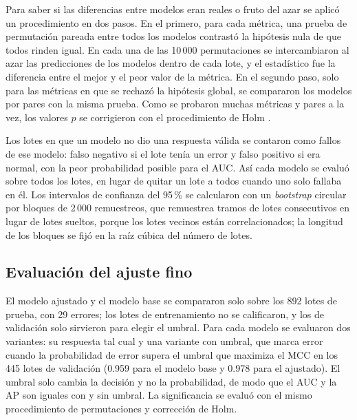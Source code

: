 Para saber si las diferencias entre modelos eran reales o fruto del azar se aplicó un procedimiento en dos pasos. En el primero, para cada métrica, una prueba de permutación pareada entre todos los modelos contrastó la hipótesis nula de que todos rinden igual. En cada una de las 10\,000 permutaciones se intercambiaron al azar las predicciones de los modelos dentro de cada lote, y el estadístico fue la diferencia entre el mejor y el peor valor de la métrica. En el segundo paso, solo para las métricas en que se rechazó la hipótesis global, se compararon los modelos por pares con la misma prueba. Como se probaron muchas métricas y pares a la vez, los valores $p$ se corrigieron con el procedimiento de Holm \cite{holm1979_sequential}.

Los lotes en que un modelo no dio una respuesta válida se contaron como fallos de ese modelo: falso negativo si el lote tenía un error y falso positivo si era normal, con la peor probabilidad posible para el AUC. Así cada modelo se evaluó sobre todos los lotes, en lugar de quitar un lote a todos cuando uno solo fallaba en él. Los intervalos de confianza del 95\,\% se calcularon con un \textit{bootstrap} circular por bloques de 2\,000 remuestreos, que remuestrea tramos de lotes consecutivos en lugar de lotes sueltos, porque los lotes vecinos están correlacionados; la longitud de los bloques se fijó en la raíz cúbica del número de lotes.

\subsection{Evaluación del ajuste fino}

El modelo ajustado y el modelo base se compararon solo sobre los 892 lotes de prueba, con 29 errores; los lotes de entrenamiento no se calificaron, y los de validación solo sirvieron para elegir el umbral. Para cada modelo se evaluaron dos variantes: su respuesta tal cual y una variante con umbral, que marca error cuando la probabilidad de error supera el umbral que maximiza el MCC en los 445 lotes de validación (0.959 para el modelo base y 0.978 para el ajustado). El umbral solo cambia la decisión y no la probabilidad, de modo que el AUC y la AP son iguales con y sin umbral. La significancia se evaluó con el mismo procedimiento de permutaciones y corrección de Holm.

